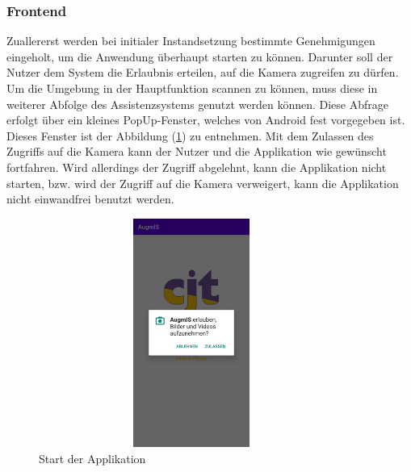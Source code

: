 \subsubsection{Frontend}
Zuallererst werden bei initialer Instandsetzung bestimmte Genehmigungen eingeholt, um die Anwendung überhaupt starten zu können. Darunter soll der Nutzer dem System 
die Erlaubnis erteilen, auf die Kamera zugreifen zu dürfen. Um die Umgebung in der Hauptfunktion scannen zu können, muss diese in weiterer Abfolge des Assistenzsystems genutzt werden können. 
Diese Abfrage erfolgt über ein kleines PopUp-Fenster, welches von Android fest vorgegeben ist. Dieses Fenster ist der Abbildung (\ref{pic:camera_perm}) 
zu entnehmen. Mit dem Zulassen des Zugriffs auf die Kamera kann der Nutzer und die Applikation wie gewünscht fortfahren. Wird allerdings der Zugriff abgelehnt, kann 
die Applikation nicht starten, bzw. wird der Zugriff auf die Kamera verweigert, kann die Applikation nicht einwandfrei benutzt werden.     
\begin{figure}[hbt!]
    \centering
    \includegraphics[width=10cm,height=7.5cm,keepaspectratio]{4Umsetzung/Bilder/camera_permission.jpg}
    \caption{Start der Applikation}
    \label{pic:camera_perm}
\end{figure}
\\ 
\linebreak
